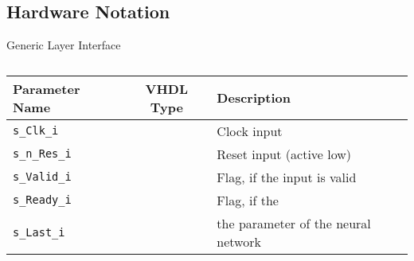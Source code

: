 \subsection{Hardware Notation}


Generic Layer Interface

\begin{table}[h!]
\centering	
\begin{tabular}{l|cl}
	\toprule
	Parameter Name 		   & VHDL Type  & Description \\
	\midrule
	\texttt{s\_Clk\_i} 	       & \stdlogic  & Clock input		\\
	\texttt{s\_n\_Res\_i} 	   & \stdlogic  & Reset input (active low)		\\
	\texttt{s\_Valid\_i} 	   & \stdlogic  & Flag, if the input is valid		\\
	\texttt{s\_Ready\_i} 	   & \stdlogic  & Flag, if the 		\\
	\texttt{s\_Last\_i} 	   & \stdlogic  & the parameter of the neural network		\\
	\bottomrule
\end{tabular}
\caption{}
\label{tab:hw-layer-interface}
\end{table}

